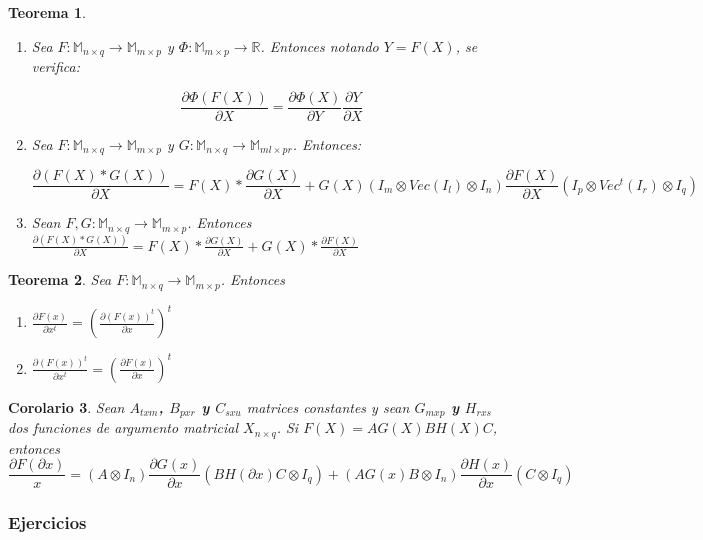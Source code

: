 \documentclass{article}
\theoremstyle{theorem-style}  %
\newtheorem{theorem}{Teorema}[section]  %
\newtheorem{corollary}[theorem]{Corolario} %
\theoremstyle{definition-style}
\theoremstyle{example-style}
\theoremstyle{exercise-style}
\begin{document}
\begin{theorem}
\begin{enumerate}
			\item Sea $F: \mathbb{M}_{n \times q} \rightarrow \mathbb{M}_{m \times p}$ y $\Phi: \mathbb{M}_{m \times p} \rightarrow \mathbb{R}$. Entonces notando $Y=F(X)$, se verifica:
			
			$$ \frac{\partial \Phi(F(X))}{\partial X} = \frac{\partial \Phi(X)}{\partial Y} \frac{\partial Y}{\partial X}$$ 
			
			
			\item Sea $F: \mathbb{M}_{n \times q} \rightarrow \mathbb{M}_{m \times p}$ y $G: \mathbb{M}_{n \times q} \rightarrow \mathbb{M}_{ml \times pr}$. Entonces:
			
			$$ \frac{\partial(F(X) * G(X))}{\partial X} = F(X)*\frac{\partial G(X)}{\partial X} + G(X)(I_m \otimes Vec(I_l) \otimes I_n)\frac{\partial F(X)}{\partial X}(I_p \otimes Vec^t(I_r) \otimes I_q)$$
			
			\item Sean $F, G: \mathbb{M}_{n \times q} \rightarrow \mathbb{M}_{m \times p}$. Entonces $ \frac{\partial(F(X) * G(X))}{\partial X} = F(X)*\frac{\partial G(X)}{\partial X} + G(X)* \frac{\partial F(X)}{\partial X}$
		\end{enumerate}
	\end{theorem}
	
	\begin{theorem}
		\textit{Sea $F:\mathbb{M}_{n\times q}\rightarrow \mathbb{M}_{m\times p}$. Entonces }
		\begin{enumerate}
			\item $\frac{\partial F(x)}{\partial x^t} =(\frac{\partial (F(x))^t}{\partial x})^t $
			
			\item $\frac{\partial (F(x))^t}{\partial x^t} =(\frac{\partial F(x)}{\partial x})^t$
		\end{enumerate}
	\end{theorem}
	
	\begin{corollary}
		\textit{	Sean \textbf{$A_{txm}$, $B_{pxr}$ y $C_{sxu}$} matrices constantes y sean \textbf{$G_{mxp}$ y $H_{rxs}$} dos funciones de argumento matricial $X_{n\times 	q}$. Si \textbf{$F(X) = AG(X)BH(X)C$}, entonces
			\textbf{$$ \frac{\partial F(\partial x)}{x}= (A \otimes I_n)\frac{\partial G(x)}{\partial x}(BH(\partial x)C \otimes I_q) + (AG(x)B \otimes I_n)\frac{\partial H(x)}{\partial x}(C \otimes I_q)$$}
		}
	\end{corollary}
	
	\subsubsection{Ejercicios}
	
\end{document}
